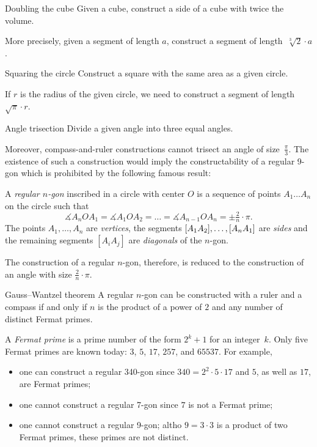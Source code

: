 \begin{thm*}{Doubling the cube}
Given a cube, construct a side of a cube with twice the volume.

More precisely, 
given a segment of length $a$,
construct a segment of length~$\sqrt[3]{2}\cdot a$.
\end{thm*}

\begin{thm*}{Squaring the circle}
Construct a square with the same area as a given circle.
\end{thm*}

If $r$ is the radius of the given circle, we need to construct a segment of length~$\sqrt{\pi}\cdot r$. 

\begin{thm*}{Angle trisection} 
Divide a given angle into three equal angles.
\end{thm*}

Moreover, compass-and-ruler constructions cannot trisect an angle of size~$\tfrac\pi3$. 
The existence of such a construction would imply the constructability of a regular 9-gon which is prohibited by the following famous result:

A \emph{regular $n$-gon} inscribed in a circle with center $O$ is a sequence of points $A_1\dots A_n$ on the circle such that 
\[\measuredangle A_nOA_1=\measuredangle A_1OA_2=\dots=\measuredangle A_{n-1}OA_n=\pm\tfrac2n\cdot \pi.\]
The points $A_1,\dots, A_n$ are \emph{vertices},
the segments $[A_1A_2], \dots, [A_nA_1]$ are \emph{sides} 
and the remaining segments $[A_iA_j]$ are \emph{diagonals} of the $n$-gon.

The construction of a regular $n$-gon, therefore, is reduced to the construction of an angle with size $\tfrac2n\cdot \pi$.

\begin{thm}{Gauss--Wantzel theorem}
A regular $n$-gon can be constructed with a ruler and a compass 
if and only if 
$n$ is the product of a power of $2$ and any number of distinct Fermat primes.
\end{thm}

A \emph{Fermat prime} is a prime number of the form $2^k+1$ for an integer~$k$.
Only five Fermat primes are known  today: $3$, $5$, $17$, $257$, and $65537$.
For example, 
\begin{itemize}
\item one can construct a regular 340-gon since $340=2^2\cdot 5\cdot 17$ and $5$, as well as $17$, are Fermat primes;
\item one cannot construct a regular 7-gon since $7$ is not a Fermat prime;
\item one cannot construct a regular 9-gon; 
altho $9=3\cdot 3$ is a product of two Fermat primes, 
these primes are not distinct.
\end{itemize}


